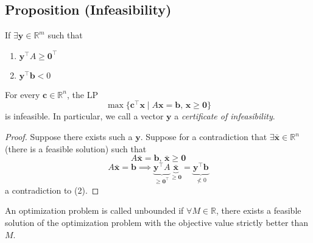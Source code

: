 \begin{thmbox}
    \subsection{Proposition (Infeasibility)}
    If
    $\exists \mathbf{y}\in\mathbb{R}^m$ such that
    \begin{enumerate}[(1)]
        \item $\mathbf{y}^\top A\ge\mathbf{0}^\top $
        \item $\mathbf{y}^\top \mathbf{b}<0$
    \end{enumerate}
    For every $\mathbf{c}\in\mathbb{R}^n$, the LP
    \[\max \{\mathbf{c}^\top \mathbf{x} \mid A\mathbf{x}=\mathbf{b}\text{, }
    \mathbf{x}\ge\mathbf{0}\}\]
    is infeasible. In particular, we call a vector $\mathbf{y}$ a \emph{certificate of infeasibility}.
\end{thmbox}

\begin{proof}
Suppose there exists such a $ \mathbf{y} $.
Suppose for a contradiction that $\exists\mathbf{\bar{x}}\in\mathbb{R}^n$ 
(there is a feasible solution)
such that
\[A\mathbf{\bar{x}}=\mathbf{b} \text{, }\mathbf{\bar{x}}\ge \mathbf{0}\]
\[
    A\mathbf{\bar{x}}=\mathbf{b}
    \implies
    \underbrace{\mathbf{y}^\top A}_{\ge\mathbf{0}^\top }
    \underbrace{\mathbf{\bar{x}}}_{\ge\mathbf{0}}
    =\underbrace{\mathbf{y}^\top \mathbf{b}}_{\nless 0}
\]
a contradiction to (2).
\end{proof}

An optimization problem is called unbounded if $\forall M\in\mathbb{R}$, there
exists a feasible solution of the optimization problem with the objective 
value strictly better than $M$.
